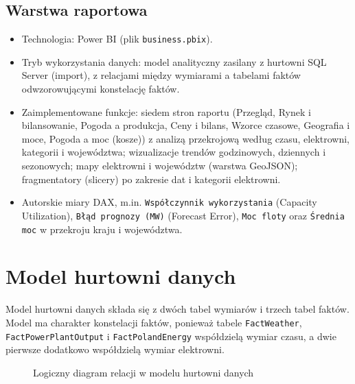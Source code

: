 \documentclass[12pt]{article}
\begin{document}
	\subsection{Warstwa raportowa}
	\begin{itemize}
		\item Technologia: Power BI (plik \texttt{business.pbix}).
		\item Tryb wykorzystania danych: model analityczny zasilany z hurtowni SQL Server (import), z relacjami między wymiarami a tabelami faktów odwzorowującymi konstelację faktów.
		\item Zaimplementowane funkcje: siedem stron raportu (Przegląd, Rynek i bilansowanie, Pogoda a produkcja, Ceny i bilans, Wzorce czasowe, Geografia i moce, Pogoda a moc (kosze)) z analizą przekrojową według czasu, elektrowni, kategorii i województwa; wizualizacje trendów godzinowych, dziennych i sezonowych; mapy elektrowni i województw (warstwa GeoJSON); fragmentatory (slicery) po zakresie dat i kategorii elektrowni.
		\item Autorskie miary DAX, m.in. \texttt{Współczynnik wykorzystania} (Capacity Utilization), \texttt{Błąd prognozy (MW)} (Forecast Error), \texttt{Moc floty} oraz \texttt{Średnia moc} w przekroju kraju i województwa.
	\end{itemize}

	\newpage
	\section{Model hurtowni danych}

	Model hurtowni danych składa się z dwóch tabel wymiarów i trzech tabel faktów. Model ma charakter konstelacji faktów, ponieważ tabele \texttt{FactWeather}, \texttt{FactPowerPlantOutput} i \texttt{FactPolandEnergy} współdzielą wymiar czasu, a dwie pierwsze dodatkowo współdzielą wymiar elektrowni.

	\begin{figure}[h!]
		\centering
		\caption{Logiczny diagram relacji w modelu hurtowni danych}
	\end{figure}
\end{document}
